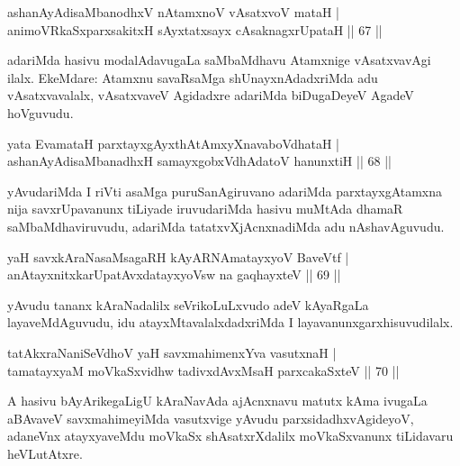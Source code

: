 \begin{shl}
ashanAyAdisaMbanodhxV nA\s \s tamxnoV vAsatxvoV mataH |\\
animoVRkaSxparxsakitxH sAyxtatxsayx cAsaknagxrUpataH \hfill || 67 ||
\end{shl}

\begin{artha}
adariMda hasivu modalAdavugaLa saMbaMdhavu Atamxnige vAsatxvavAgi ilalx. EkeMdare: Atamxnu savaRsaMga shUnayxnAdadxriMda adu vAsatxvavalalx, vAsatxvaveV Agidadxre adariMda biDugaDeyeV AgadeV hoVguvudu.
\end{artha}

\begin{shl}
yata EvamataH parxtayxgAyxthAtAmxyXnavaboVdhataH |\\
ashanAyAdisaMbanadhxH samayxgobxVdhAdatoV hanunxtiH \hfill || 68 ||
\end{shl}

\begin{artha}
yAvudariMda I riVti asaMga puruSanAgiruvano adariMda parxtayxgAtamxna nija savxrUpavanunx tiLiyade iruvudariMda hasivu muMtAda dhamaR saMbaMdhaviruvudu, adariMda tatatxvXjAcnxnadiMda adu nAshavAguvudu.
\end{artha}


\begin{shl}
yaH savxkAraNasaMsagaRH kAyARNAmatayxyoV BaveVtf |\\
anAtayxnitxkarUpatAvxdatayxyoV\s sw na gaqhayxteV \hfill || 69 ||
\end{shl}

\begin{artha}
yAvudu tananx kAraNadalilx seVrikoLuLxvudo adeV kAyaRgaLa layaveMdAguvudu, idu atayxMtavalalxdadxriMda I layavanunx\break garxhisuvudilalx.
\end{artha}


\begin{shl}
tatAkxraNaniSeVdhoV yaH savxmahimenxYva vasutxnaH |\\
tamatayxyaM moVkaSxvidhw tadivxdAvxMsaH parxcakaSxteV \hfill || 70 ||
\end{shl}

\begin{artha}
A hasivu bAyArikegaLigU kAraNavAda ajAcnxnavu matutx kAma ivugaLa aBAvaveV savxmahimeyiMda vasutxvige yAvudu parxsidadhxvAgideyoV, adaneVnx atayxyaveMdu moVkaSx shAsatxrXdalilx moVkaSxvanunx tiLidavaru heVLutAtxre.
\end{artha}


